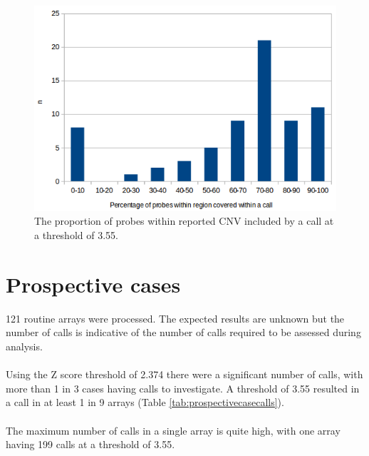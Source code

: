 \begin{figure}
\centering
\includegraphics[width=1\linewidth]{./Figures/testcasestrueposcoverage}
\caption[Test cases: the proportion of probes within reported CNV included by a call at a threshold of 3.55]{The proportion of probes within reported CNV included by a call at a threshold of 3.55.}
\label{fig:testcasestrueposcoverage}
\end{figure}


\section{Prospective cases}
121 routine arrays were processed. The expected results are unknown but the number of calls is indicative of the number of calls required to be assessed during analysis.
\paragraph*{}
Using the Z score threshold of 2.374 there were a significant number of calls, with more than 1 in 3 cases having calls to investigate. A threshold of 3.55 resulted in a call in at least 1 in 9 arrays (Table \ref{tab:prospectivecasecalls}).
\paragraph*{}
The maximum number of calls in a single array is quite high, with one array having 199 calls at a threshold of 3.55.

